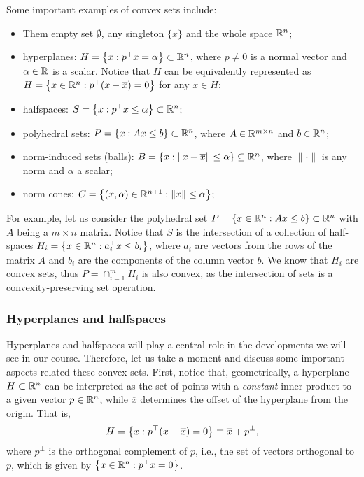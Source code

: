 Some important examples of convex sets include:
\begin{itemize}
	\item Them empty set $\emptyset$, any singleton $\{\overline{x}\}$ and the whole space $\mathbb{R}^n$; 
	\item hyperplanes: $H = \left\{ x : p^\top x = \alpha \right \} \subset \mathbb{R}^n$, where $p \neq 0$ is a normal vector and $\alpha\in \mathbb{R}$ is a scalar. Notice that $H$ can be equivalently represented as $H = \left\{ x \in \mathbb{R}^n: p^\top(x - \overline{x}) = 0 \right \}$ for any $\overline{x} \in H$;
	\item halfspaces: $S = \left\{ x : p^\top x \leq \alpha \right \} \subset \mathbb{R}^n$;
	\item polyhedral sets: $P = \left\{ x : Ax \leq b \right \} \subset \mathbb{R}^n$, where $A\in \mathbb{R}^{m\times n}$ and $b \in \mathbb{R}^n$;
	\item norm-induced sets (balls): $B = \left\{ x : \|x - \overline{x}\| \leq \alpha \right \} \subseteq \mathbb{R}^n$, where $\| \cdot \|$ is any norm and $\alpha$ a scalar;
	\item norm cones: $C =\left\{ (x,\alpha) \in \mathbb{R}^{n+1}: \|x\| \leq \alpha \right \} $;
\end{itemize} 

For example, let us consider the polyhedral set $P = \left\{ x \in \mathbb{R}^n : Ax \leq b \right \} \subset \mathbb{R}^n$ with $A$ being a $m \times n$ matrix. Notice that $S$ is the intersection of a collection of half-spaces $H_i = \left\{ x \in \mathbb{R}^n : a_i^\top x \leq b_i \right \}$, where $a_i$ are vectors from the rows of the matrix $A$ and $b_i$ are the components of the column vector $b$. We know that $H_i$ are convex sets, thus $P = \cap_{i=1}^m H_i$ is also convex, as the intersection of sets is a convexity-preserving set operation.


\subsubsection{Hyperplanes and halfspaces}

Hyperplanes and halfspaces will play a central role in the developments we will see in our course. Therefore, let us take a moment and discuss some important aspects related these convex sets. First, notice that, geometrically, a hyperplane $H \subset \mathbb{R}^n$ can be interpreted as the set of points with a \emph{constant} inner product to a given vector $p \in \mathbb{R}^n$, while $\overline{x}$ determines the offset of the hyperplane from the origin. That is,
	\begin{equation*}
		H = \left\{ x : p^\top(x - \overline{x}) = 0 \right \} \equiv \overline{x} + p^{\perp},
	\end{equation*}
	where $p^\perp$ is the orthogonal complement of $p$, i.e., the set of vectors orthogonal to $p$, which is given by $\left\{ x \in \mathbb{R}^n : p^\top x = 0 \right \}$.
	
